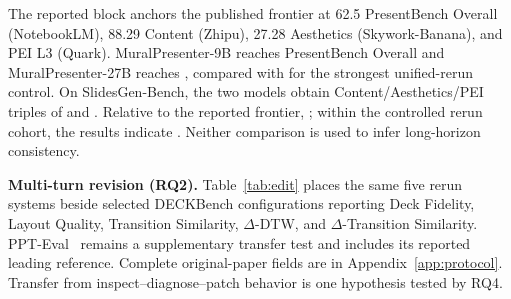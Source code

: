 The reported block anchors the published frontier at 62.5 PresentBench Overall (NotebookLM), 88.29 Content (Zhipu), 27.28 Aesthetics (Skywork-Banana), and PEI L3 (Quark). MuralPresenter-9B reaches \resulttbd{[TBD:G\_M9\_PB]} PresentBench Overall and MuralPresenter-27B reaches \resulttbd{[TBD:G\_M27\_PB]}, compared with  for the strongest unified-rerun control. On SlidesGen-Bench, the two models obtain Content/Aesthetics/PEI triples of  and . Relative to the reported frontier, ; within the controlled rerun cohort, the results indicate . Neither comparison is used to infer long-horizon consistency.

\textbf{Multi-turn revision (RQ2).} Table~\ref{tab:edit} places the same five rerun systems beside selected DECKBench configurations reporting Deck Fidelity, Layout Quality, Transition Similarity, \(\Delta\)-DTW, and \(\Delta\)-Transition Similarity. PPT-Eval~\citep{gandhi2026ppteval} remains a supplementary transfer test and includes its reported leading reference. Complete original-paper fields are in Appendix~\ref{app:protocol}. Transfer from inspect--diagnose--patch behavior is one hypothesis tested by RQ4.

